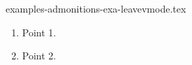 \begin{filecontents*}[overwrite]{examples-admonitions-exa-leavevmode.tex}
  \begin{tdocexa}
      \leavevmode
      \begin{enumerate}
          \item Point 1.

          \item Point 2.
      \end{enumerate}
  \end{tdocexa}
\end{filecontents*}
